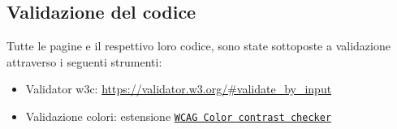 \subsection{Validazione del codice}
Tutte le pagine e il respettivo loro codice, sono state sottoposte a validazione attraverso i seguenti strumenti:\begin{itemize}
\item Validator w3c: \url{https://validator.w3.org/#validate_by_input}
\item Validazione colori: estensione \href{https://chrome.google.com/webstore/detail/wcag-color-contrast-
check/plnahcmalebffmaghcpcmpaciebdhgdf}{\texttt{WCAG Color contrast checker}}
\end{itemize}